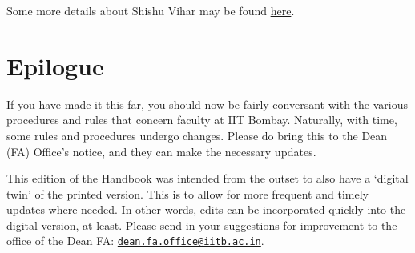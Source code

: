 \documentclass[
  10pt,
  a5paper,
  10pt,
  openany]{amsbook}
\begin{document}
Some more details about Shishu Vihar may be found
\href{https://www.facebook.com/pg/Sishu-Vihar-441328895915841/about/}{here}.


\chapter*{Epilogue}\label{epilogue}


If you have made it this far, you should now be fairly conversant with
the various procedures and rules that concern faculty at IIT Bombay.
Naturally, with time, some rules and procedures undergo changes. Please
do bring this to the Dean (FA) Office's notice, and they can make the
necessary updates.

This edition of the Handbook was intended from the outset to also have a
`digital twin' of the printed version. This is to allow for more
frequent and timely updates where needed. In other words, edits can be
incorporated quickly into the digital version, at least. Please send in
your suggestions for improvement to the office of the Dean FA:
\href{mailto:dean.fa.office@iitb.ac.in}{\nolinkurl{dean.fa.office@iitb.ac.in}}.
\end{document}
